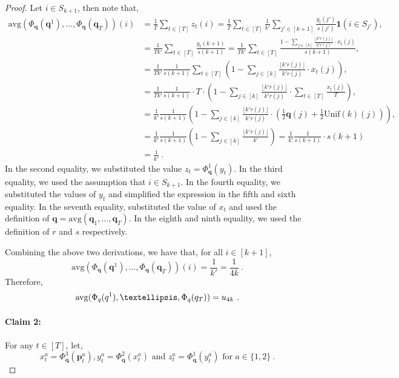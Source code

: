 \documentclass[10pt]{article} %
\theoremstyle{plain}
\newcommand{\bp}{\textbf{p}}
\newcommand{\unik}{\mathrm{Unif}(k)}%
\newcommand{\bq}{\textbf{q}}
\newcommand{\avg}{\mathrm{avg}}
\begin{document}
\begin{proof}
	Let $i \in S_{k+1}$, then note that,
	\begingroup
	\allowdisplaybreaks
	\begin{align*}
		\avg(\Phi_{\bq}(\bq^1),\dots,\Phi_{\bq}(\bq_T))(i)
		&=\frac{1}{T}\sum_{t \in [T]}z_t(i)
		=\frac{1}{T}\sum_{t \in [T]}\frac{1}{k'}\sum_{j' \in [k+1]}\frac{y_t(j')}{s(j')}\textbf{1}(i \in S_{j'}),\\
		&=\frac{1}{Tk'} \sum_{t \in [T]}\frac{y_t(k+1)}{s(k+1)}
		=\frac{1}{Tk'} \sum_{t \in [T]}\frac{1-\sum_{j\in [k]}\frac{\lfloor k'r(j)\rfloor}{k'r(j)} \cdot x_t(j)}{s(k+1)},\\
		&=\frac{1}{Tk'}\frac{1}{s(k+1)} \sum_{t \in [T]}\left(1-\sum_{j\in [k]}\frac{\lfloor k'r(j)\rfloor}{k'r(j)} \cdot x_t(j)\right),\\
		&=\frac{1}{Tk'}\frac{1}{s(k+1)}\cdot T \cdot \left(1-\sum_{j\in [k]}\frac{\lfloor k'r(j)\rfloor}{k'r(j)} \cdot \sum_{t \in [T]}\frac{x_t(j)}{T}\right),\\
		&=\frac{1}{k'}\frac{1}{s(k+1)}\left(1-\sum_{j\in [k]}\frac{\lfloor k'r(j)\rfloor}{k'r(j)} \cdot (\frac{1}{2}\bq(j)+\frac{1}{2}\unik(j))\right),\\
		&=\frac{1}{k'}\frac{1}{s(k+1)}\left(1-\sum_{j\in [k]}\frac{\lfloor k'r(j)\rfloor}{k'}\right)=\frac{1}{k'}\frac{1}{s(k+1)}\cdot s(k+1) \\
		&=\frac{1}{k'}~.
	\end{align*}
	\endgroup
	In the second equality, we substituted the value $z_t=\Phi_{\bq}^1(y_t)$. In the third equality, we used the assumption that $i \in S_{k+1}$. In the fourth equality, we substituted the values of $y_t$ and simplified the expression in the fifth and sixth equality. In the seventh equality, substituted the value of $x_t$ and used the definition of $\bq=\avg(\bq_1, \dots, \bq_T)$. In the eighth and ninth equality, we used the definition of $r$ and $s$ respectively.
	
	Combining the above two derivations, we have that, for all $i \in [k+1]$,
	$$\avg(\Phi_{\bq}(\bq^1),\dots,\Phi_{\bq}(\bq_T))(i)=\frac{1}{k'}=\frac{1}{4k}~.$$
	Therefore,
	$$\avg(\Phi_{\bq}(\bq^1),\dots,\Phi_{\bq}(\bq_T))=\uni_{4k}~.$$
	\paragraph{Claim 2:}
	For any $t \in [T]$, let,
	$$x^a_t=\Phi_{\bq}^3(\bp^a_t), y^a_t=\Phi_{\bq}^2(x^a_t) \text{ and }z^a_t=\Phi_{\bq}^1(y^a_t) \text{ for }a\in \{1,2 \}~.$$
	

\end{proof}
\end{document}
